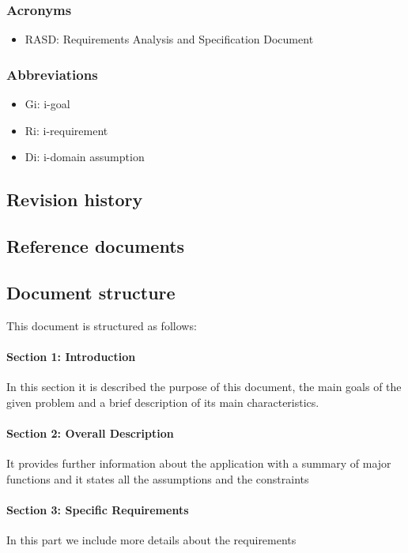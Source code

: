 \documentclass[12pt,titlepage]{article}
\begin{document}
\subsubsection{Acronyms}\label{RASD}
\begin{itemize}
\item	RASD: Requirements Analysis and Specification Document
\end{itemize}
\subsubsection{Abbreviations}\label{RASD}
\begin{itemize}
\item	Gi: i-goal
\item	Ri: i-requirement
\item	Di: i-domain assumption
\end{itemize}
\subsection{Revision history}\label{RASD}

\subsection{Reference documents}\label{RASD}

\subsection{Document structure}\label{RASD}
This document is structured as follows:
\paragraph{Section 1: Introduction}
In this section it is described the purpose of this document, the main goals of the given problem and a brief description of its main characteristics. 
\paragraph{Section 2: Overall Description}
It provides further information about the application with a summary of major functions and it states all the assumptions and the constraints 
\paragraph{Section 3: Specific Requirements}
In this part we include more details about the requirements 
\end{document}
